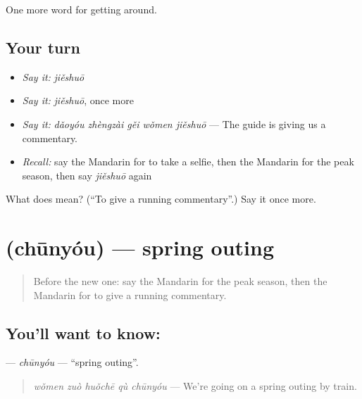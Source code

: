 \begin{grammarlens}[title={What you've built}]
One more word for getting around.
\end{grammarlens}

\subsection*{Your turn}
\begin{itemize}
\raggedright
  \item \emph{Say it:} \emph{jiěshuō}
  \item \emph{Say it:} \emph{jiěshuō}, once more
  \item \emph{Say it:} \emph{dǎoyóu zhèngzài gěi wǒmen jiěshuō} — The guide is giving us a commentary.
  \item \emph{Recall:} say the Mandarin for to take a selfie, then the Mandarin for the peak season, then say \emph{jiěshuō} again
\end{itemize}

\begin{tcolorbox}[breakable,colback=teal!4,colframe=teal!35!black,title={Before you move on}]
What does  mean? (\textquotedblleft{}To give a running commentary\textquotedblright{}.) Say it once more.
\end{tcolorbox}
\section[\texorpdfstring{\zh{春游} (chūnyóu)}{春游 (chūnyóu)}]{ (chūnyóu) — spring outing}

\label{lesson:ZH-C431-chunyou}



\begin{quote}
Before the new one: say the Mandarin for the peak season, then the Mandarin for to give a running commentary.
\end{quote}

\subsection*{You'll want to know: }
\textbf{} — \emph{chūnyóu} — \textquotedblleft{}spring outing\textquotedblright{}.

\begin{quote}
\textbf{} \emph{wǒmen zuò huǒchē qù chūnyóu} — We're going on a spring outing by train.
\end{quote}

